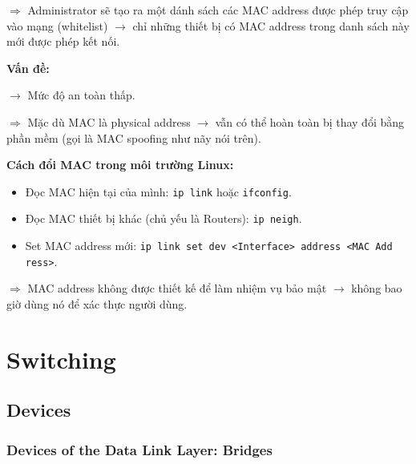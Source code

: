 $\Rightarrow$ Administrator sẽ tạo ra một dánh sách các MAC address được phép truy cập vào mạng (whitelist) $\rightarrow$ chỉ những thiết bị có MAC address trong danh sách này mới được phép kết nối.
\medskip

\noindent
\textbf{Vấn đề:}
\medskip

\noindent
$\rightarrow$ Mức độ an toàn thấp.

$\Rightarrow$ Mặc dù MAC là physical address $\rightarrow$ vẫn có thể hoàn toàn bị thay đổi bằng phần mềm (gọi là MAC spoofing như nãy nói trên).
\medskip

\noindent
\textbf{Cách đổi MAC trong môi trường Linux:}

\begin{itemize}
    \item Đọc MAC hiện tại của mình: \texttt{ip link} hoặc \texttt{ifconfig}.
    \item Đọc MAC thiết bị khác (chủ yếu là Routers): \texttt{ip neigh}.
    \item Set MAC address mới: \texttt{ip link set dev <Interface> address <MAC Add\\ress>}.
\end{itemize}
\medskip


\noindent
$\Rightarrow$ MAC address không được thiết kế để làm nhiệm vụ bảo mật $\rightarrow$ không bao giờ dùng nó để xác thực người dùng.
\medskip

\section{Switching}

\subsection{Devices}

\subsubsection{Devices of the Data Link Layer: Bridges}

